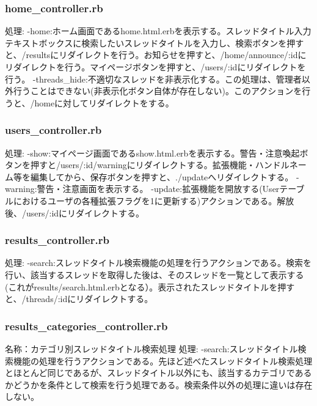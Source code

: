 \documentclass[a4j]{jarticle}
\begin{document}
\subsubsection{home\_controller.rb}
処理:\newline
-home:ホーム画面であるhome.html.erbを表示する。スレッドタイトル入力テキストボックスに検索したいスレッドタイトルを入力し、検索ボタンを押すと、/resultsにリダイレクトを行う。お知らせを押すと、/home/announce/:idにリダイレクトを行う。マイページボタンを押すと、/users/:idにリダイレクトを行う。\newline
-threads\_hide:不適切なスレッドを非表示化する。この処理は、管理者以外行うことはできない(非表示化ボタン自体が存在しない)。このアクションを行うと、/homeに対してリダイレクトをする。

\subsubsection{users\_controller.rb}
処理:\newline
-show:マイページ画面であるshow.html.erbを表示する。警告・注意喚起ボタンを押すと/users/:id/warningにリダイレクトする。拡張機能・ハンドルネーム等を編集してから、保存ボタンを押すと、./updateへリダイレクトする。\newline
-warning:警告・注意画面を表示する。\newline
-update:拡張機能を開放する(Userテーブルにおけるユーザの各種拡張フラグを1に更新する)アクションである。解放後、/users/:idにリダイレクトする。

\subsubsection{results\_controller.rb}
処理:\newline
-search:スレッドタイトル検索機能の処理を行うアクションである。検索を行い、該当するスレッドを取得した後は、そのスレッドを一覧として表示する(これがresults/search.html.erbとなる）。表示されたスレッドタイトルを押すと、/threads/:idにリダイレクトする。\newline

\subsubsection{results\_categories\_controller.rb}
\noindent 名称：カテゴリ別スレッドタイトル検索処理 \newline
処理:\newline
-search:スレッドタイトル検索機能の処理を行うアクションである。先ほど述べたスレッドタイトル検索処理とほとんど同じであるが、スレッドタイトル以外にも、該当するカテゴリであるかどうかを条件として検索を行う処理である。検索条件以外の処理に違いは存在しない。\newline
\end{document}
